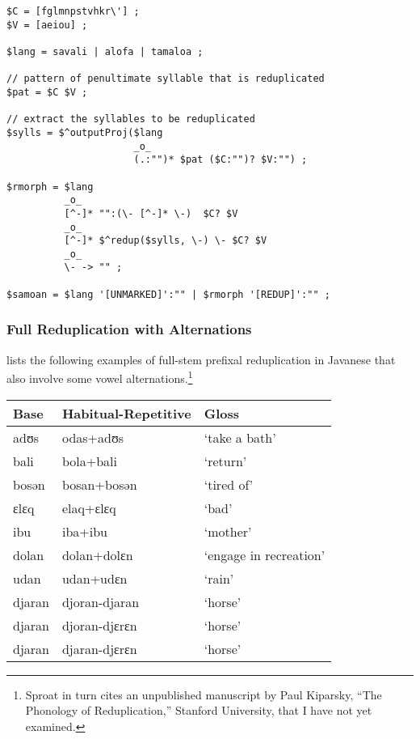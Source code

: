 \begin{Verbatim}
$C = [fglmnpstvhkr\'] ;
$V = [aeiou] ;

$lang = savali | alofa | tamaloa ;

// pattern of penultimate syllable that is reduplicated
$pat = $C $V ;

// extract the syllables to be reduplicated
$sylls = $^outputProj($lang
                      _o_
					  (.:"")* $pat ($C:"")? $V:"") ;

$rmorph = $lang
          _o_
          [^-]* "":(\- [^-]* \-)  $C? $V 
          _o_
          [^-]* $^redup($sylls, \-) \- $C? $V
          _o_
          \- -> "" ;

$samoan = $lang '[UNMARKED]':"" | $rmorph '[REDUP]':"" ;
\end{Verbatim}

\subsubsection{Full Reduplication with Alternations}

\citet[p. 57]{sproat:1992} lists the following examples of full-stem
prefixal reduplication in Javanese that also involve some vowel
alternations.\footnote{Sproat in turn
cites an unpublished manuscript by Paul
Kiparsky, ``The Phonology of Reduplication,'' Stanford University, that
I have not yet examined.}

\vspace{0.5cm}

\begin{tabular}{|l|l|l|}
\hline
     \textbf{Base}   & \textbf{Habitual-Repetitive} & \textbf{Gloss}\\
\hline
     adʊs   & odas+adʊs         &  `take a bath'\\
     bali   &bola+bali          & `return'\\
     bosən  &bosan+bosən        & `tired of'\\
     ɛlɛq   &elaq+ɛlɛq          & `bad'\\
     ibu    &iba+ibu            & `mother'\\
\hline
     dolan  &dolan+dolɛn       &  `engage in recreation'\\
     udan   &udan+udɛn         &  `rain'\\
\hline
     djaran &djoran-djaran     &  `horse'\\
     djaran &djoran-djɛrɛn     & `horse'\\
     djaran &djaran-djɛrɛn     &  `horse'\\
\hline
\end{tabular}

